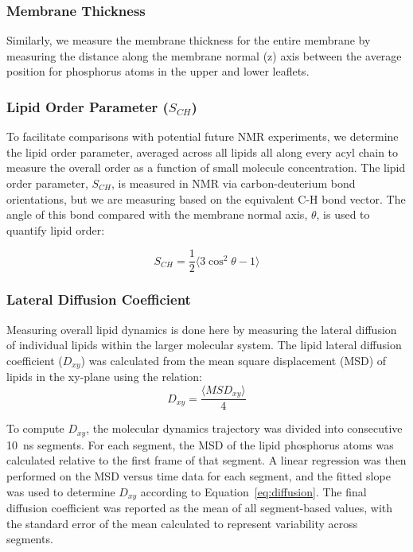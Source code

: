 \subsubsection*{Membrane Thickness}

Similarly, we measure the membrane thickness for the entire membrane by measuring the distance along the membrane normal (z) axis between the average position for phosphorus atoms in the upper and lower leaflets.


\subsubsection*{Lipid Order Parameter ($S_{CH}$)}
To facilitate comparisons with potential future NMR experiments, we determine the lipid order parameter, averaged across all lipids all along every acyl chain to measure the overall order as a function of small molecule concentration.
The lipid order parameter, $S_{CH}$, is measured in NMR via carbon-deuterium bond orientations, but we are measuring based on the equivalent C-H bond vector.
The angle of this bond compared with the membrane normal axis, $\theta$, is used to quantify lipid order:

\begin{equation}
	\label{eq:order}
S_{CH} = \frac{1}{2} \langle 3 \cos^2 \theta - 1 \rangle
\end{equation}

\subsubsection*{Lateral Diffusion Coefficient}
Measuring overall lipid dynamics is done here by measuring the lateral diffusion of individual lipids within the larger molecular system.
The lipid lateral diffusion coefficient ($D_{xy}$) was calculated from the mean square displacement (MSD) of lipids in the xy-plane using the relation:
\begin{equation}
	\label{eq:diffusion}
D_{xy} = \frac{\langle MSD_{xy} \rangle}{4}
\end{equation}

To compute $D_{xy}$, the molecular dynamics trajectory was divided into consecutive 10~ns segments. For each segment, the MSD of the lipid phosphorus atoms was calculated relative to the first frame of that segment.
A linear regression was then performed on the MSD versus time data for each segment, and the fitted slope was used to determine $D_{xy}$ according to Equation~\ref{eq:diffusion}. 
The final diffusion coefficient was reported as the mean of all segment-based values, with the standard error of the mean calculated to represent variability across segments.

